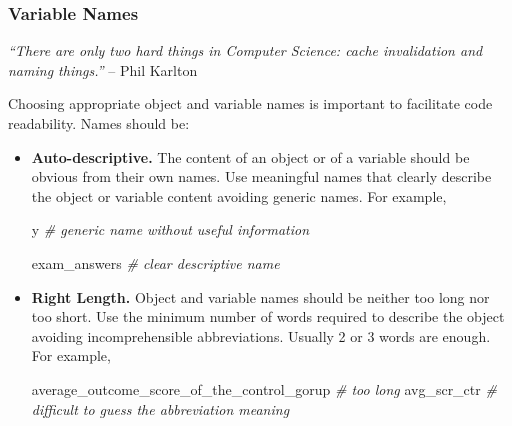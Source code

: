 \documentclass[
  11pt,
]{book}
\newenvironment{Shaded}{\begin{snugshade}}{\end{snugshade}}
\newcommand{\CommentTok}[1]{\textcolor[rgb]{0.56,0.35,0.01}{\textit{#1}}}
\newcommand{\NormalTok}[1]{#1}
\renewenvironment{quote}
               {\list{}{\rightmargin\leftmargin}%
                \item\relax\begin{line-left}\setlength{\parskip}{1em}}
               {\end{line-left}\endlist}
\newenvironment{code-tex-bad}
  {\begingroup\definecolor{shadecolor}{RGB}{255, 189, 185}}
  {\endgroup}
\newenvironment{code-tex-good}
  {\begingroup\definecolor{shadecolor}{RGB}{224, 240, 227}}
  {\endgroup}
\begin{document}
\hypertarget{variable-names}{%
\subsubsection{Variable Names}\label{variable-names}}

\begin{quote}
\emph{``There are only two hard things in Computer Science: cache invalidation and naming things.''} -- Phil Karlton
\end{quote}

Choosing appropriate object and variable names is important to facilitate code readability. Names should be:

\begin{itemize}
\item
  \textbf{Auto-descriptive.} The content of an object or of a variable should be obvious from their own names. Use meaningful names that clearly describe the object or variable content avoiding generic names. For example,

  \begin{code-tex-bad}

\begin{Shaded}
\begin{Highlighting}[]
\NormalTok{y }\CommentTok{\# generic name without useful information}
\end{Highlighting}
\end{Shaded}

  \end{code-tex-bad}

  \begin{code-tex-good}

\begin{Shaded}
\begin{Highlighting}[]
\NormalTok{exam\_answers }\CommentTok{\# clear descriptive name}
\end{Highlighting}
\end{Shaded}

  \end{code-tex-good}
\item
  \textbf{Right Length.} Object and variable names should be neither too long nor too short. Use the minimum number of words required to describe the object avoiding incomprehensible abbreviations. Usually 2 or 3 words are enough. For example,

  \begin{code-tex-bad}

\begin{Shaded}
\begin{Highlighting}[]
\NormalTok{average\_outcome\_score\_of\_the\_control\_gorup }\CommentTok{\# too long}
\NormalTok{avg\_scr\_ctr }\CommentTok{\# difficult to guess the abbreviation meaning}
\end{Highlighting}
\end{Shaded}


\end{code-tex-bad}
\end{itemize}
\end{document}
